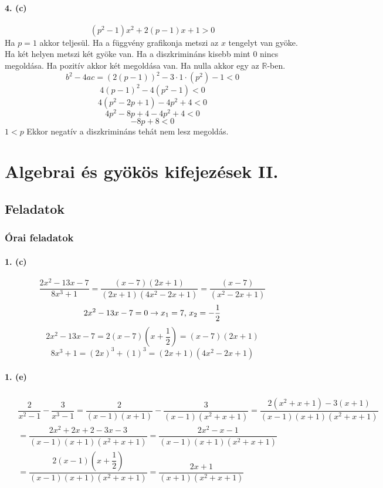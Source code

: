 \documentclass[12pt,a4paper,fleqn]{article}
\newcommand{\myparagraph}[1]{\paragraph{#1}\mbox{}}
\begin{document}
\myparagraph{4. (c)}
\[ (p^2-1)x^2 + 2(p-1)x + 1 > 0 \]
Ha $p=1$ akkor teljesül.
Ha a függvény grafikonja metszi az $x$ tengelyt van gyöke. Ha két helyen metszi
két gyöke van. Ha a diszkrimináns kisebb mint 0 nincs megoldása. Ha pozitív
akkor két megoldása van. Ha nulla akkor egy az $\mathbb{R}$-ben.
\[ b^2-4ac=(2(p-1))^2-3 \cdot 1 \cdot (p^2)-1 < 0 \]
\[ 4(p-1)^2 - 4(p^2 - 1) < 0 \]
\[ 4(p^2 - 2p + 1) - 4p^2 + 4 < 0 \]
\[ 4p^2 - 8p + 4 - 4p^2 + 4 < 0 \]
\[ -8p + 8 < 0 \]
$ 1 < p $ Ekkor negatív a diszkrimináns tehát nem lesz megoldás.



\section{Algebrai és gyökös kifejezések II.}
\setcounter{subsection}{1}
\subsection{Feladatok}
\subsubsection{Órai feladatok}


\myparagraph{1. (c)}
\[ \dfrac{2x^2-13x-7}{8x^3+1} = \dfrac{(x-7)(2x+1)}{(2x+1)(4x^2-2x+1)} =
  \dfrac{(x-7)}{(x^2-2x+1)} \]
\[ 2x^2-13x-7=0 \rightarrow x_1 = 7$, $x_2 = -\dfrac{1}{2} \]
\[ 2x^2-13x-7=2(x-7)(x+\dfrac{1}{2})=(x-7)(2x+1) \]
\[ 8x^3 + 1 = (2x)^3 + (1)^3 = (2x+1)(4x^2-2x+1) \]


\myparagraph{1. (e)}
\begin{align*}
  \begin{split}
    & \dfrac{2}{x^2-1} -\dfrac{3}{x^3-1} = \dfrac{2}{(x-1)(x+1)} -
      \dfrac{3}{(x-1)(x^2+x+1)} = \dfrac{2(x^2+x+1)-3(x+1)}{(x-1)(x+1)(x^2+x+1)}
      \\[10pt]
    &= \dfrac{2x^2+2x+2-3x-3}{(x-1)(x+1)(x^2+x+1)} =
      \dfrac{2x^2-x-1}{(x-1)(x+1)(x^2+x+1)} \\[10pt]
    &= \dfrac{2(x-1)(x+\dfrac{1}{2})}{(x-1)(x+1)(x^2+x+1)} =
      \dfrac{2x+1}{(x+1)(x^2+x+1)}
  \end{split}
\end{align*}
\end{document}

